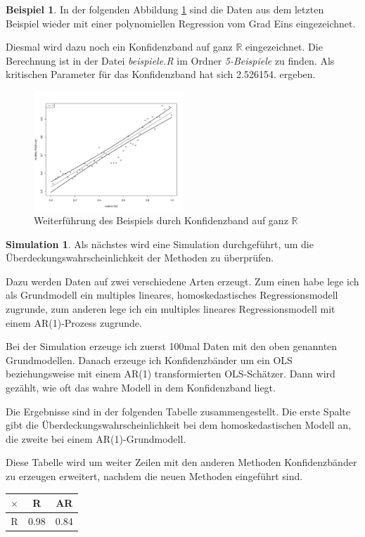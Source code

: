 \documentclass[12pt,a4paper]{article}
\theoremstyle{definition}
\newtheorem{Beispiel}[Definition]{Beispiel}
\theoremstyle{definition}
\theoremstyle{definition}
\newtheorem{Simulation}[Definition]{Simulation}
\newcommand{\cR}{2.526154}
\newcommand{\ntest}{100}
\newcommand{\UeberRR}{0.98}
\newcommand{\UeberARR}{0.84}
\begin{document}
\begin{Beispiel}
In der folgenden Abbildung \ref{KB-ganz-R-BSP} sind die Daten aus dem letzten Beispiel wieder mit einer polynomiellen Regression vom Grad Eins eingezeichnet.

Diesmal wird dazu noch ein Konfidenzband auf ganz $\mathbb{R}$ eingezeichnet. Die Berechnung ist in der Datei \textit{beispiele.R} im Ordner \textit{5-Beispiele} zu finden. Als kritischen Parameter für das Konfidenzband hat sich \cR . ergeben.

\begin{figure}[H] 
  \centering
     \includegraphics[width=0.5\textwidth]{Bsp-KB-R}
  \caption{Weiterführung des Beispiels durch Konfidenzband auf ganz $\mathbb{R}$}
  \label{KB-ganz-R-BSP}
\end{figure}

\end{Beispiel}

\begin{Simulation}
Als nächstes wird eine Simulation durchgeführt, um die Überdeckungswahrscheinlichkeit der Methoden zu überprüfen.

Dazu werden Daten auf zwei verschiedene Arten erzeugt. Zum einen habe lege ich als Grundmodell ein multiples lineares, homoskedastisches Regressionsmodell zugrunde, zum anderen lege ich ein multiples lineares Regressionsmodell mit einem AR(1)-Prozess zugrunde. 

Bei der Simulation erzeuge ich zuerst \ntest mal Daten mit den oben genannten Grundmodellen. Danach erzeuge ich Konfidenzbänder um ein OLS beziehungsweise mit einem AR(1) transformierten OLS-Schätzer. Dann wird gezählt, wie oft das wahre Modell in dem Konfidenzband liegt. 

Die Ergebnisse sind in der folgenden Tabelle zusammengestellt. Die erste Spalte gibt die Überdeckungswahrscheinlichkeit bei dem homoskedastischen Modell an, die zweite bei einem AR(1)-Grundmodell. 

Diese Tabelle wird um weiter Zeilen mit den anderen Methoden Konfidenzbänder zu erzeugen erweitert, nachdem die neuen Methoden eingeführt sind.

\begin{center}
\begin{tabular}{|c|c|c|}
\hline 
$\times$ & R & AR \\ 
\hline 
R & \UeberRR & \UeberARR \\ 
\hline 
\end{tabular}
\end{center}

\end{Simulation}
\end{document}
